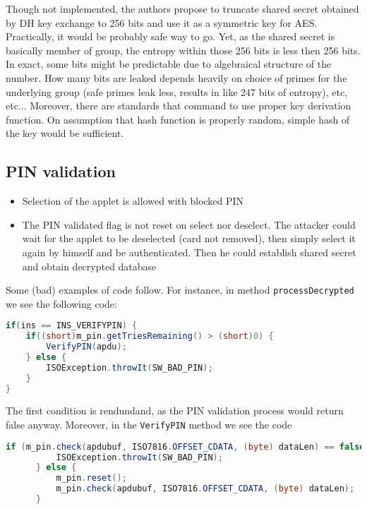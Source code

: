\documentclass[11pt,a4paper]{article}
\begin{document}
Though not implemented, the authors propose to truncate shared secret obtained by DH key exchange to 256 bits and use it as a symmetric key for AES. Practically, it would be probably safe way to go. Yet, 
as the shared secret is basically member of group, the entropy within those 256 bits is less then 256 bits. In exact, some bits might be predictable due to algebraical structure of the number. How many bits are leaked depends heavily on choice of primes for the underlying group (safe primes leak less, results in like 247 bits of entropy), etc, etc... Moreover, there are standards that command to use proper key derivation function. On assumption that hash function is properly random, simple hash of the key would be sufficient.

\subsection*{PIN validation}

\begin{itemize}
	\item Selection of the applet is allowed with blocked PIN
	\item The PIN validated flag is not reset on select nor deselect. The attacker could wait for the applet to be deselected (card not removed), then simply select it again by himself and be authenticated. Then he could establish shared secret and obtain decrypted database
\end{itemize}

Some (bad) examples of code follow. For instance, in method \texttt{processDecrypted} we see the following code:

\begin{lstlisting}[language=java]
if(ins == INS_VERIFYPIN) {
	if((short)m_pin.getTriesRemaining() > (short)0) {
		VerifyPIN(apdu); 
	} else {
		ISOException.throwIt(SW_BAD_PIN);
	}
}
\end{lstlisting}

The first condition is rendundand, as the PIN validation process would return false anyway. Moreover, in the \texttt{VerifyPIN} method we see the code

\begin{lstlisting}[language=java]
if (m_pin.check(apdubuf, ISO7816.OFFSET_CDATA, (byte) dataLen) == false) { 
          ISOException.throwIt(SW_BAD_PIN);
      } else {
          m_pin.reset();
          m_pin.check(apdubuf, ISO7816.OFFSET_CDATA, (byte) dataLen);
      }
\end{lstlisting}
\end{document}
